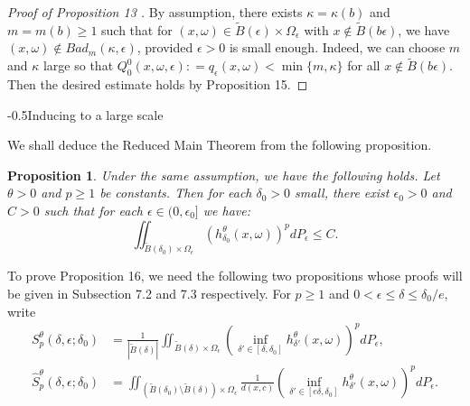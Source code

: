 \documentclass[11pt,oneside]{article}
\makeatletter
\theoremstyle{plain}
\newtheorem{prop}{Proposition}
\numberwithin{equation}{section}
\numberwithin{figure}{section}
\numberwithin{table}{section}
\renewcommand{\section}{\@startsection{section}{1}{0mm}
{-\baselineskip}{0.5\baselineskip}{\Large\bf\leftline}}
\makeatother
\begin{document}
\begin{proof}[Proof of Proposition 13 ]

By assumption, there exists $\kappa = \kappa(b) $ and $m = m(b)  \geq 1$ such that for $(x, \omega) \in \tilde B(\epsilon) \times \Omega_{\epsilon}$ with $x \notin \tilde B(b \epsilon)$, we have $(x, \omega) \notin Bad_{m}(\kappa, \epsilon)$, provided $\epsilon> 0$ is small enough. Indeed, we can choose $m$ and $\kappa$ large so that $Q_0^0(x, \omega, \epsilon) : = q_{\epsilon}(x, \omega) < \min\{m,\kappa\}$ for all $x \notin \tilde B(b \epsilon)$. Then the desired estimate holds by Proposition 15. 
 
\end{proof}



\section{Inducing to a large scale}




We shall deduce the Reduced Main Theorem from the following proposition.


\begin{prop}
Under the same assumption, we have the following holds. Let $\theta >0$ and $p \geq 1$
 be constants. Then for each $\delta_0 > 0$ small, there exist $\epsilon_0 >0$ and $C>0$ such that for each $\epsilon \in (0, \epsilon_0]$ we have:
 \[
 \iint_{\tilde B(\delta_0) \times \Omega_{\epsilon}} (h_{\delta_0}^{\theta} (x, \omega))^p d P_{\epsilon} \leq C.
 \]

\end{prop}


To prove Proposition 16, we need the following two propositions whose proofs will be given in Subsection 7.2 and 7.3 respectively. For $p \geq 1$ and $0 < \epsilon \leq \delta \leq \delta_0/e$, write
\begin{align}
S_p^{\theta} (\delta, \epsilon; \delta_0) & = \frac{1}{|\tilde B(\delta)|} \iint_{\tilde B(\delta) \times \Omega_{\epsilon}} \left( \inf_{\delta' \in [\delta, \delta_0]} h^{\theta}_{\delta'} (x, \omega) \right)^p d P_{\epsilon},   \\
\hat S_p^{\theta} (\delta, \epsilon; \delta_0)  & = \iint_{(\tilde B(\delta_0) \setminus \tilde B(\delta))\times \Omega_{\epsilon}} \frac{1}{d(x, c)} \left( \inf_{\delta' \in [e\delta, \delta_0]} h^{\theta}_{\delta'} (x, \omega) \right)^p d P_{\epsilon}.
\end{align}
\end{document}
